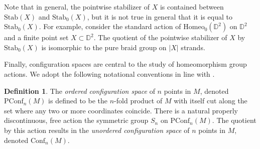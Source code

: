 \documentclass[10pt, oneside]{article}
\newcommand{\D}{\mathbb{D}}
\newcommand{\homeo}[1][S^1]{\text{Homeo}_0(#1)}
\newcommand{\conf}[2][S^1]{\text{Conf}_{#2}(#1)}
\newcommand{\pconf}[2][S^1]{\text{PConf}_{#2}(#1)}
\newcommand{\stab}[1]{\text{Stab}(#1)}
\newcommand{\pstab}[1]{\text{Stab}_0(#1)}
\theoremstyle{definition}
\newtheorem{defn}{Definition}[section]
\theoremstyle{definition}
\begin{document}
Note that in general, the pointwise stabilizer of $X$ is contained between $\stab{X}$ and $\pstab{X}$, but it is not true in general that it is equal to $\pstab{X}$. For example, consider the standard action of $\homeo[\D^2]$ on $\D^2$ and a finite point set $X\subset \D^2$. The quotient of the pointwise stabilizer of $X$ by $\pstab{X}$ is isomorphic to the pure braid group on $|X|$ strands.

Finally, configuration spaces are central to the study of homeomorphism group actions. We adopt the following notational conventions in line with \cite{chen_structure_2023}.

\begin{defn}
    The {\it ordered configuration space} of $n$ points in $M$, denoted $\pconf[M]{n}$ is defined to be the $n$-fold product of $M$ with itself cut along the set where any two or more coordinates coincide. There is a natural properly discontinuous, free action the symmetric group $S_n$ on $\pconf[M]{n}$. The quotient by this action results in the {\it unordered configuration space} of $n$ points in $M$, denoted $\conf[M]{n}$.
\end{defn}
\end{document}
